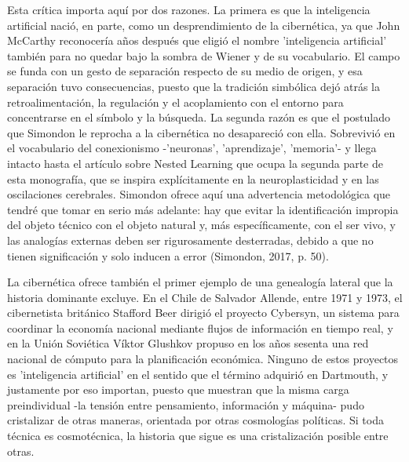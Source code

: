 Esta crítica importa aquí por dos razones. La primera es que la inteligencia artificial nació, en parte, como un desprendimiento de la cibernética, ya que John McCarthy reconocería años después que eligió el nombre 'inteligencia artificial' también para no quedar bajo la sombra de Wiener y de su vocabulario. El campo se funda con un gesto de separación respecto de su medio de origen, y esa separación tuvo consecuencias, puesto que la tradición simbólica dejó atrás la retroalimentación, la regulación y el acoplamiento con el entorno para concentrarse en el símbolo y la búsqueda. La segunda razón es que el postulado que Simondon le reprocha a la cibernética no desapareció con ella. Sobrevivió en el vocabulario del conexionismo -'neuronas', 'aprendizaje', 'memoria'- y llega intacto hasta el artículo sobre Nested Learning que ocupa la segunda parte de esta monografía, que se inspira explícitamente en la neuroplasticidad y en las oscilaciones cerebrales. Simondon ofrece aquí una advertencia metodológica que tendré que tomar en serio más adelante: hay que evitar la identificación impropia del objeto técnico con el objeto natural y, más específicamente, con el ser vivo, y las analogías externas deben ser rigurosamente desterradas, debido a que no tienen significación y solo inducen a error (Simondon, 2017, p. 50).

La cibernética ofrece también el primer ejemplo de una genealogía lateral que la historia dominante excluye. En el Chile de Salvador Allende, entre 1971 y 1973, el cibernetista británico Stafford Beer dirigió el proyecto Cybersyn, un sistema para coordinar la economía nacional mediante flujos de información en tiempo real, y en la Unión Soviética Víktor Glushkov propuso en los años sesenta una red nacional de cómputo para la planificación económica. Ninguno de estos proyectos es 'inteligencia artificial' en el sentido que el término adquirió en Dartmouth, y justamente por eso importan, puesto que muestran que la misma carga preindividual -la tensión entre pensamiento, información y máquina- pudo cristalizar de otras maneras, orientada por otras cosmologías políticas. Si toda técnica es cosmotécnica, la historia que sigue es una cristalización posible entre otras.

